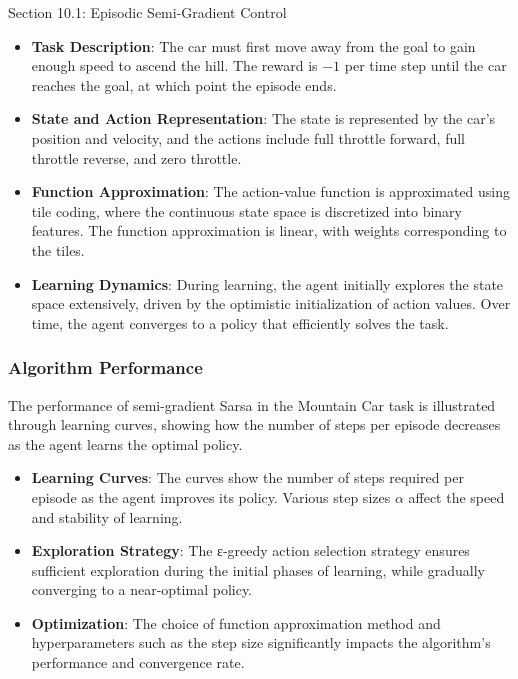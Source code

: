 \begin{notes}{Section 10.1: Episodic Semi-Gradient Control}
\begin{highlight}
        \begin{itemize}
            \item \textbf{Task Description}: The car must first move away from the goal to gain enough speed to ascend the hill. The reward is $-1$ per time step until the car reaches the goal, at which point the 
            episode ends.
            \item \textbf{State and Action Representation}: The state is represented by the car's position and velocity, and the actions include full throttle forward, full throttle reverse, and zero throttle.
            \item \textbf{Function Approximation}: The action-value function is approximated using tile coding, where the continuous state space is discretized into binary features. The function approximation is 
            linear, with weights corresponding to the tiles.
            \item \textbf{Learning Dynamics}: During learning, the agent initially explores the state space extensively, driven by the optimistic initialization of action values. Over time, the agent converges to a 
            policy that efficiently solves the task.
        \end{itemize}
    
    \end{highlight}
    
    \subsubsection*{Algorithm Performance}
    
    The performance of semi-gradient Sarsa in the Mountain Car task is illustrated through learning curves, showing how the number of steps per episode decreases as the agent learns the optimal policy.
    
    \begin{highlight}
    
        \begin{itemize}
            \item \textbf{Learning Curves}: The curves show the number of steps required per episode as the agent improves its policy. Various step sizes $\alpha$ affect the speed and stability of learning.
            \item \textbf{Exploration Strategy}: The ε-greedy action selection strategy ensures sufficient exploration during the initial phases of learning, while gradually converging to a near-optimal policy.
            \item \textbf{Optimization}: The choice of function approximation method and hyperparameters such as the step size significantly impacts the algorithm's performance and convergence rate.
        \end{itemize}
    

\end{highlight}
\end{notes}
